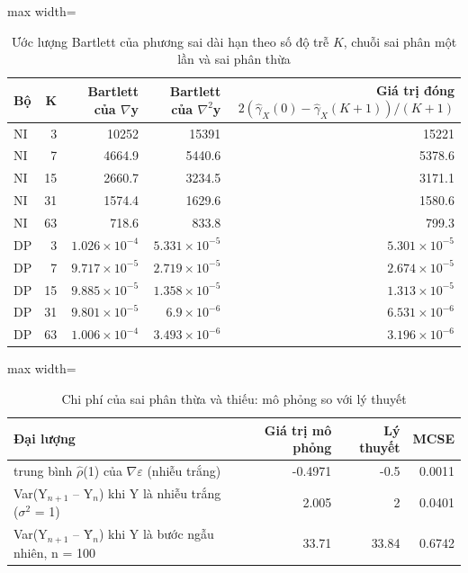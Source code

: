 \begin{table}[H]
\centering\footnotesize
\caption{Ước lượng Bartlett của phương sai dài hạn theo số độ trễ $K$, chuỗi sai phân một lần và sai phân thừa}\label{tab:tab_b12_03_bartlett_by_k}
\begin{adjustbox}{max width=\linewidth}
\begin{tabular}{|l|r|r|r|r|}
\toprule
Bộ & K & Bartlett của $\nabla$y & Bartlett của $\nabla^{2}$y & Giá trị đóng $2(\hat\gamma_X(0)-\hat\gamma_X(K+1))/(K+1)$ \\
\midrule
NI & 3 & 10252 & 15391 & 15221 \\
NI & 7 & 4664.9 & 5440.6 & 5378.6 \\
NI & 15 & 2660.7 & 3234.5 & 3171.1 \\
NI & 31 & 1574.4 & 1629.6 & 1580.6 \\
NI & 63 & 718.6 & 833.8 & 799.3 \\
DP & 3 & $1.026\times10^{-4}$ & $5.331\times10^{-5}$ & $5.301\times10^{-5}$ \\
DP & 7 & $9.717\times10^{-5}$ & $2.719\times10^{-5}$ & $2.674\times10^{-5}$ \\
DP & 15 & $9.885\times10^{-5}$ & $1.358\times10^{-5}$ & $1.313\times10^{-5}$ \\
DP & 31 & $9.801\times10^{-5}$ & $6.9\times10^{-6}$ & $6.531\times10^{-6}$ \\
DP & 63 & $1.006\times10^{-4}$ & $3.493\times10^{-6}$ & $3.196\times10^{-6}$ \\
\bottomrule
\end{tabular}
\end{adjustbox}\par{}
\end{table}
\begin{table}[H]
\centering\footnotesize
\caption{Chi phí của sai phân thừa và thiếu: mô phỏng so với lý thuyết}\label{tab:tab_b12_03_cost_simulation}
\begin{adjustbox}{max width=\linewidth}
\begin{tabular}{|>{\raggedright\arraybackslash}p{}|r|r|r|}
\toprule
Đại lượng & Giá trị mô phỏng & Lý thuyết & MCSE \\
\midrule
trung bình $\hat{\rho}$(1) của $\nabla\varepsilon$ (nhiễu trắng) & -0.4971 & -0.5 & 0.0011 \\[3pt]
Var(Y$_{n+1}$ – Y$_{n}$) khi Y là nhiễu trắng ($\sigma^{2}$ = 1) & 2.005 & 2 & 0.0401 \\[3pt]
Var(Y$_{n+1}$ – Ȳ$_{n}$) khi Y là bước ngẫu nhiên, n = 100 & 33.71 & 33.84 & 0.6742 \\[3pt]
\bottomrule
\end{tabular}
\end{adjustbox}
\end{table}
